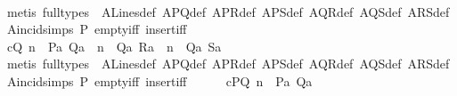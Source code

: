 \begin{isabellebody}
\ \ \ \ \ \ \isamarkupfalse%
\ {\isacharparenleft}{\kern0pt}metis\ {\isacharparenleft}{\kern0pt}full{\isacharunderscore}{\kern0pt}types{\isacharparenright}{\kern0pt}\ {\isachardoublequoteopen}{}{\isachardoublequoteclose}\ A{}Lines{\isacharunderscore}{\kern0pt}def\ A{}PQ{\isacharunderscore}{\kern0pt}def\ A{}PR{\isacharunderscore}{\kern0pt}def\ A{}PS{\isacharunderscore}{\kern0pt}def\ A{}QR{\isacharunderscore}{\kern0pt}def\ A{}QS{\isacharunderscore}{\kern0pt}def\ A{}RS{\isacharunderscore}{\kern0pt}def\ A{}incid{\isachardot}{\kern0pt}simps\ P{}\ empty{\isacharunderscore}{\kern0pt}iff\ insert{\isacharunderscore}{\kern0pt}iff{\isacharparenright}{\kern0pt}\isanewline
\ \ \ \ \isamarkupfalse%
\ cQ{\isacharcolon}{\kern0pt}\ {\isachardoublequoteopen}{\isacharparenleft}{\kern0pt}n\ {\isacharequal}{\kern0pt}\ {\isacharbraceleft}{\kern0pt}Pa{\isacharcomma}{\kern0pt}\ Qa{\isacharbraceright}{\kern0pt}{\isacharparenright}{\kern0pt}\ {\isasymor}\ {\isacharparenleft}{\kern0pt}n\ {\isacharequal}{\kern0pt}\ {\isacharbraceleft}{\kern0pt}Qa{\isacharcomma}{\kern0pt}\ Ra{\isacharbraceright}{\kern0pt}{\isacharparenright}{\kern0pt}\ {\isasymor}\ {\isacharparenleft}{\kern0pt}n\ {\isacharequal}{\kern0pt}\ {\isacharbraceleft}{\kern0pt}Qa{\isacharcomma}{\kern0pt}\ Sa{\isacharbraceright}{\kern0pt}{\isacharparenright}{\kern0pt}{\isachardoublequoteclose}\ \ \isanewline
\ \ \ \ \ \ \isamarkupfalse%
\ {\isacharparenleft}{\kern0pt}metis\ {\isacharparenleft}{\kern0pt}full{\isacharunderscore}{\kern0pt}types{\isacharparenright}{\kern0pt}\ {\isachardoublequoteopen}{}{\isachardoublequoteclose}\ A{}Lines{\isacharunderscore}{\kern0pt}def\ A{}PQ{\isacharunderscore}{\kern0pt}def\ A{}PR{\isacharunderscore}{\kern0pt}def\ A{}PS{\isacharunderscore}{\kern0pt}def\ A{}QR{\isacharunderscore}{\kern0pt}def\ A{}QS{\isacharunderscore}{\kern0pt}def\ A{}RS{\isacharunderscore}{\kern0pt}def\ A{}incid{\isachardot}{\kern0pt}simps\ P{}\ empty{\isacharunderscore}{\kern0pt}iff\ insert{\isacharunderscore}{\kern0pt}iff{\isacharparenright}{\kern0pt}\isanewline
\ \ \ \ \isamarkupfalse%
\ cPQ{\isacharcolon}{\kern0pt}\ {\isachardoublequoteopen}n\ {\isacharequal}{\kern0pt}\ {\isacharbraceleft}{\kern0pt}Pa{\isacharcomma}{\kern0pt}\ Qa{\isacharbraceright}{\kern0pt}{\isachardoublequoteclose}\ \isamarkupfalse%

\end{isabellebody}
